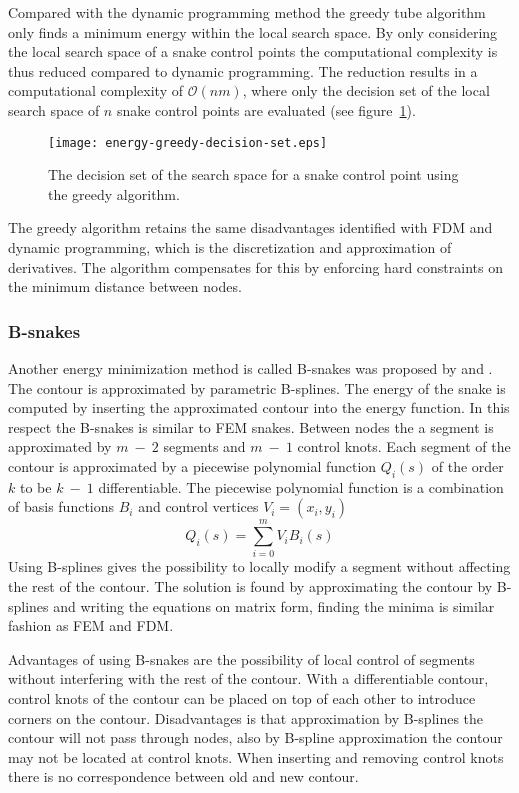 Compared with the dynamic programming method the greedy tube algorithm
only finds a minimum energy within the local search space. By only
considering the local search space of a snake control points the
computational complexity is thus reduced compared to dynamic
programming. The reduction results in a computational complexity of
$\mathcal{O}(nm)$, where only the decision set of the local search
space of $n$ snake control points are evaluated (see
figure~\ref{fig:energy-greedy-decision-set}).
\begin{figure}[htbp]
  \centering
  \texttt{[image: energy-greedy-decision-set.eps]}
  \caption{The decision set of the search space for a snake control point using the greedy algorithm.}
  \label{fig:energy-greedy-decision-set}
\end{figure}

The greedy algorithm retains the same disadvantages identified with
FDM and dynamic programming, which is the discretization and
approximation of derivatives. The algorithm compensates for this by
enforcing hard constraints on the minimum distance between nodes.



\subsubsection{B-snakes}
\label{sec:b-snakes}

Another energy minimization method is called B-snakes was proposed by
\citet{menet90} and \citet{liao92}. The contour is approximated by
parametric B-splines. The energy of the snake is computed by inserting
the approximated contour into the energy function. In this respect the
B-snakes is similar to FEM snakes. Between nodes the a segment is
approximated by $m~-~2$ segments and $m~-~1$ control knots. Each
segment of the contour is approximated by a piecewise polynomial
function $Q_i(s)$ of the order $k$ to be $k~-~1$ differentiable. The
piecewise polynomial function is a combination of basis functions
$B_i$ and control vertices $V_i = (x_i, y_i)$
\begin{equation}
  \nonumber
  Q_i(s) = \sum^m_{i=0} V_i B_i(s)
\end{equation}
Using B-splines gives the possibility to locally modify a segment
without affecting the rest of the contour. The solution is found by
approximating the contour by B-splines and writing the equations on
matrix form, finding the minima is similar fashion as FEM and FDM.

Advantages of using B-snakes are the possibility of local control of
segments without interfering with the rest of the contour. With a
differentiable contour, control knots of the contour can be placed on
top of each other to introduce corners on the contour. Disadvantages
is that approximation by B-splines the contour will not pass through
nodes, also by B-spline approximation the contour may not be located
at control knots. When inserting and removing control knots there is no
correspondence between old and new contour.

